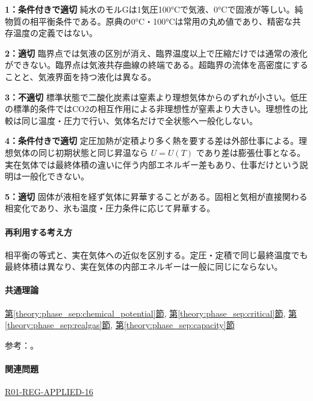 \noindent\textbf{1：条件付きで適切} 純水のモルGは1気圧100°Cで気液、0°Cで固液が等しい。純物質の相平衡条件である。原典の0°C・100°Cは常用の丸め値であり、精密な共存温度の定義ではない。\par

\noindent\textbf{2：適切} 臨界点では気液の区別が消え、臨界温度以上で圧縮だけでは通常の液化ができない。臨界点は気液共存曲線の終端である。超臨界の流体を高密度にすることと、気液界面を持つ液化は異なる。\par

\noindent\textbf{3：不適切} 標準状態で二酸化炭素は窒素より理想気体からのずれが小さい。低圧の標準的条件ではCO2の相互作用による非理想性が窒素より大きい。理想性の比較は同じ温度・圧力で行い、気体名だけで全状態へ一般化しない。\par

\noindent\textbf{4：条件付きで適切} 定圧加熱が定積より多く熱を要する差は外部仕事による。理想気体の同じ初期状態と同じ昇温なら \(U=U(T)\) であり差は膨張仕事となる。実在気体では最終体積の違いに伴う内部エネルギー差もあり、仕事だけという説明は一般化できない。\par

\noindent\textbf{5：適切} 固体が液相を経ず気体に昇華することがある。固相と気相が直接関わる相変化であり、氷も温度・圧力条件に応じて昇華する。\par

\paragraph{再利用する考え方} 相平衡の等式と、実在気体への近似を区別する。定圧・定積で同じ最終温度でも最終体積は異なり、実在気体の内部エネルギーは一般に同じにならない。

\paragraph{共通理論} \hyperref[theory:phase_sep:chemical_potential]{第\ref*{theory:phase_sep:chemical_potential}節}, \hyperref[theory:phase_sep:critical]{第\ref*{theory:phase_sep:critical}節}, \hyperref[theory:phase_sep:realgas]{第\ref*{theory:phase_sep:realgas}節}, \hyperref[theory:phase_sep:capacity]{第\ref*{theory:phase_sep:capacity}節}

\par 参考：\cite{iupac_greenbook2012,mit_thermo_firstlaw2008}。

\paragraph{関連問題} \hyperref[q:r01-reg-applied-16]{R01-REG-APPLIED-16}

